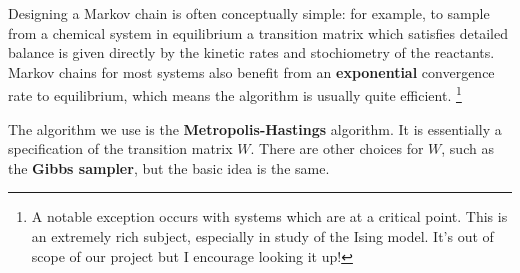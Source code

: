 \documentclass[11pt]{article}
\begin{document}
Designing a Markov chain is often conceptually simple: for example, to sample
from a chemical system in equilibrium a transition matrix which satisfies
detailed balance is given directly by the kinetic rates and stochiometry of the
reactants. Markov chains for most systems also benefit from an \textbf{exponential}
convergence rate to equilibrium, which means the algorithm is usually quite
efficient. \footnote{A notable exception occurs with systems which are at a critical point.
This is an extremely rich subject, especially in study of the Ising model. It's
out of scope of our project but I encourage looking it up!}

The algorithm we use is the \textbf{Metropolis-Hastings} algorithm. It is essentially a
specification of the transition matrix \(W\). There are other choices for \(W\),
such as the \textbf{Gibbs sampler}, but the basic idea is the same.
\end{document}
